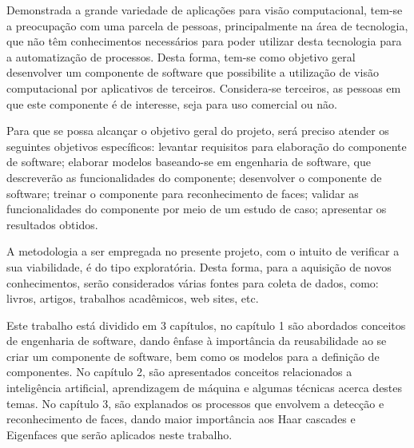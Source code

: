Demonstrada a grande variedade de aplicações para visão computacional, tem-se a preocupação com uma parcela de pessoas, principalmente na área de tecnologia, que não têm conhecimentos necessários para poder utilizar desta tecnologia para a automatização de processos. Desta forma, tem-se como objetivo geral desenvolver um componente de software que possibilite a utilização de visão computacional por aplicativos de terceiros. Considera-se terceiros, as pessoas em que este componente é de interesse, seja para uso comercial ou não.

Para que se possa alcançar o objetivo geral do projeto, será preciso atender os seguintes objetivos específicos: levantar requisitos para elaboração do componente de software; elaborar modelos baseando-se em engenharia de software, que descreverão as funcionalidades do componente; desenvolver o componente de software; treinar o componente para reconhecimento de faces; validar as funcionalidades do componente por meio de um estudo de caso; apresentar os resultados obtidos.

A metodologia a ser empregada no presente projeto, com o intuito de verificar a sua viabilidade, é do tipo exploratória. Desta forma, para a aquisição de novos conhecimentos, serão considerados várias fontes para coleta de dados, como: livros, artigos, trabalhos acadêmicos, web sites, etc.

Este trabalho está dividido em 3 capítulos, no capítulo 1 são abordados conceitos de engenharia de software, dando ênfase à importância da reusabilidade ao se criar um componente de software, bem como os modelos para a definição de componentes. No capítulo 2, são apresentados conceitos relacionados a inteligência artificial, aprendizagem de máquina e algumas técnicas acerca destes temas. No capítulo 3, são explanados os processos que envolvem a detecção e reconhecimento de faces, dando maior importância aos Haar cascades e Eigenfaces que serão aplicados neste trabalho.
